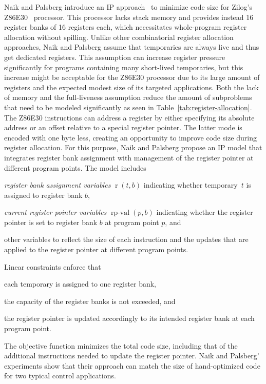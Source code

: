 \documentclass[acmsmall,authorversion,nonacm]{acmart}
\newcommand{\noMathVar}[2]{\operatorname{#1}(#2)}
\newcommand{\var}[2]{$\noMathVar{#1}{#2}$}
\begin{document}
Naik and Palsberg introduce an IP approach~\cite{Naik2002} to minimize
code size for Zilog's Z86E30~\cite{Z86E30} processor.
This processor lacks stack memory and provides instead 16 register
banks of 16 registers each, which necessitates whole-program register
allocation without spilling.
Unlike other combinatorial register allocation approaches, Naik and
Palsberg assume that temporaries are always live and thus get
dedicated registers.
This assumption can increase register pressure significantly for
programs containing many short-lived temporaries, but this increase
might be acceptable for the Z86E30 processor due to its large amount
of registers and the expected modest size of its targeted
applications.
Both the lack of memory and the full-liveness assumption reduce the
amount of subproblems that need to be modeled significantly as seen in
Table~\ref{tab:register-allocation}.
The Z86E30 instructions can address a register by either specifying
its absolute address or an offset relative to a special register
pointer.
The latter mode is encoded with one byte less, creating an opportunity
to improve code size during register allocation.
For this purpose, Naik and Palsberg propose an IP model that
integrates register bank assignment with management of the register
pointer at different program points.
The model includes
\begin{inparaitem}[]
\item \emph{register bank assignment variables} \var{r}{t,b}
  indicating whether temporary~$t$ is assigned to register bank $b$,
\item \emph{current register pointer variables} \var{rp-val}{p,b}
  indicating whether the register pointer is set to register bank $b$
  at program point $p$, and
\item other variables to reflect the size of each instruction and the
  updates that are applied to the register pointer at different
  program points.
\end{inparaitem}
Linear constraints enforce that
\begin{inparaitem}[]
\item each temporary is assigned to one register bank,
\item the capacity of the register banks is not exceeded, and
\item the register pointer is updated accordingly to its intended
  register bank at each program point.
\end{inparaitem}
The objective function minimizes the total code size, including that
of the additional instructions needed to update the register pointer.
Naik and Palsberg' experiments show that their approach can match the
size of hand-optimized code for two typical control applications.
\end{document}
